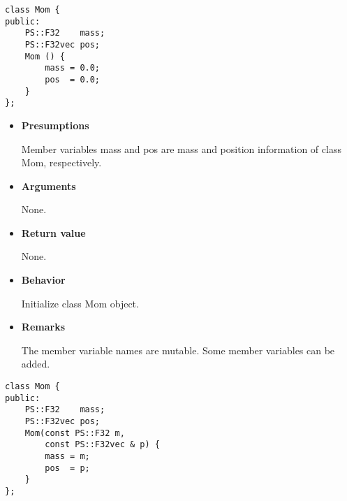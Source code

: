 \begin{screen}
\begin{verbatim}
class Mom {
public:
    PS::F32    mass;
    PS::F32vec pos;
    Mom () {
        mass = 0.0;
        pos  = 0.0;
    }
};
\end{verbatim}
\end{screen}

\begin{itemize}

\item {\bf Presumptions}

  Member variables mass and pos are mass and position information of
  class Mom, respectively.
  
\item {\bf Arguments}

  None.
  
\item {\bf Return value}

  None.

\item {\bf Behavior}

  Initialize class Mom object.
  
\item {\bf Remarks}

  The member variable names are mutable. Some member variables can be
  added.

\end{itemize}

\begin{screen}
\begin{verbatim}
class Mom {
public:
    PS::F32    mass;
    PS::F32vec pos;
    Mom(const PS::F32 m,
        const PS::F32vec & p) {
        mass = m;
        pos  = p;
    }
};
\end{verbatim}
\end{screen}

